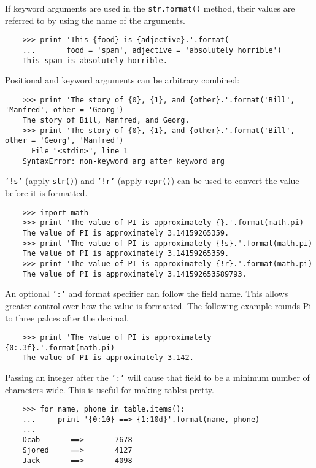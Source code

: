 \documentclass[UTF8]{article}
\begin{document}
If keyword arguments are used in the \texttt{str.format()} method, their values are referred to by
using the name of the arguments.
\begin{verbatim}
    >>> print 'This {food} is {adjective}.'.format(
    ...       food = 'spam', adjective = 'absolutely horrible')
    This spam is absolutely horrible.
\end{verbatim}

Positional and keyword arguments can be arbitrary combined:
\begin{verbatim}
    >>> print 'The story of {0}, {1}, and {other}.'.format('Bill', 'Manfred', other = 'Georg')
    The story of Bill, Manfred, and Georg.
    >>> print 'The story of {0}, {1}, and {other}.'.format('Bill', other = 'Georg', 'Manfred')
      File "<stdin>", line 1
    SyntaxError: non-keyword arg after keyword arg
\end{verbatim}

\texttt{'!s'} (apply \texttt{str()}) and \texttt{'!r'} (apply \texttt{repr()}) can be used to
convert the value before it is formatted.
\begin{verbatim}
    >>> import math
    >>> print 'The value of PI is approximately {}.'.format(math.pi)
    The value of PI is approximately 3.14159265359.
    >>> print 'The value of PI is approximately {!s}.'.format(math.pi)
    The value of PI is approximately 3.14159265359.
    >>> print 'The value of PI is approximately {!r}.'.format(math.pi)
    The value of PI is approximately 3.141592653589793.
\end{verbatim}

An optional \texttt{':'} and format specifier can follow the field name. This allows greater
control over how the value is formatted. The following example rounds Pi to three palces after the
decimal.
\begin{verbatim}
    >>> print 'The value of PI is approximately {0:.3f}.'.format(math.pi)
    The value of PI is approximately 3.142.
\end{verbatim}

Passing an integer after the \texttt{':'} will cause that field to be a minimum number of
characters wide. This is useful for making tables pretty.
\begin{verbatim}
    >>> for name, phone in table.items():
    ...     print '{0:10} ==> {1:10d}'.format(name, phone)
    ...
    Dcab       ==>       7678
    Sjored     ==>       4127
    Jack       ==>       4098
\end{verbatim}
\end{document}
